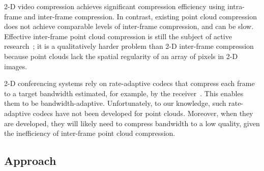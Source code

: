 %
2-D video compression achieves significant compression efficiency using intra-frame and inter-frame compression.
%
In contrast, existing point cloud compression~\cite{draco,vpcc} does not achieve comparable levels of inter-frame compression, and can be slow.
%
Effective inter-frame point cloud compression is still the subject of active research~\cite{xxx}; it is a qualitatively harder problem than 2-D inter-frame compression because point clouds lack the spatial regularity of an array of pixels in 2-D images. 

%
%
2-D conferencing systems rely on rate-adaptive codecs that compress each frame to a target bandwidth estimated, for example, by the receiver~\cite{cite:salsify}.
%
This enables them to be bandwidth-adaptive.
%
Unfortunately, to our knowledge, such rate-adaptive codecs have not been developed for point clouds.
%
Moreover, when they are developed, they will likely need to compress bandwidth to a low quality, given the inefficiency of inter-frame point cloud compression. 

\subsection{Approach}
\label{s:approach}


